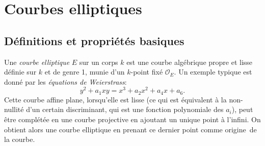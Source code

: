 \documentclass[11pt,a4paper]{article}
\renewcommand{\O}{\mathcal{O}}
\theoremstyle{definition}
\begin{document}
\vspace{1cm}

\tableofcontents

\newpage

\section{Courbes elliptiques}


\subsection{Définitions et propriétés basiques}


Une \emph{courbe elliptique} $E$ sur un corps $k$ est une courbe algébrique propre et lisse définie sur $k$ et de genre 1, munie d'un $k$-point fixé $\O_E$. Un exemple typique est donné par les \emph{équations de Weierstrass}:
$$y^2 + a_1xy = x^3 + a_2x^2 + a_4 x + a_6.$$
Cette courbe affine plane, lorsqu'elle est lisse (ce qui est équivalent à la non-nullité d'un certain discriminant, qui est une fonction polynomiale des $a_i$), peut être complétée en une courbe projective en ajoutant un unique point à l'infini. On obtient alors une courbe elliptique en prenant ce dernier point comme \og origine\fg\ de la courbe.
\end{document}
